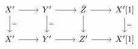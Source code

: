 \documentclass[12pt]{standalone}
\begin{document}
        $$

\begin{tikzcd}
    X^\prime \ar[r] \ar[d,"="] & Y^\prime \ar[r] \ar[d,"="] 
    & \bar{Z} \ar[r] \ar[d] & X^\prime[1] \ar[d,"="] \\
    X^\prime \ar[r] & Y^\prime \ar[r] & Z^\prime \ar[r] & X^\prime[1]
\end{tikzcd}
        $$
        
\end{document}
